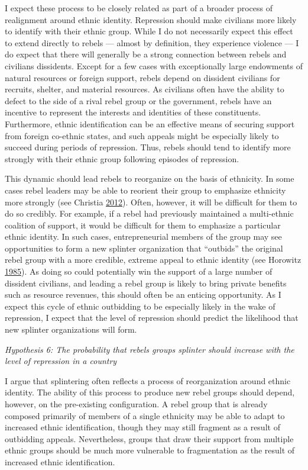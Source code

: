 \documentclass[12pt,]{book}
\theoremstyle{definition}
\theoremstyle{definition}
\theoremstyle{remark}
\begin{document}
I expect these process to be closely related as part of a broader
process of realignment around ethnic identity. Repression should make
civilians more likely to identify with their ethnic group. While I do
not necessarily expect this effect to extend directly to rebels ---
almost by definition, they experience violence --- I do expect that
there will generally be a strong connection between rebels and civilians
dissidents. Except for a few cases with exceptionally large endowments
of natural resources or foreign support, rebels depend on dissident
civilians for recruits, shelter, and material resources. As civilians
often have the ability to defect to the side of a rival rebel group or
the government, rebels have an incentive to represent the interests and
identities of these constituents. Furthermore, ethnic identification can
be an effective means of securing support from foreign co-ethnic states,
and such appeals might be especially likely to succeed during periods of
repression. Thus, rebels should tend to identify more strongly with
their ethnic group following episodes of repression.

This dynamic should lead rebels to reorganize on the basis of ethnicity.
In some cases rebel leaders may be able to reorient their group to
emphasize ethnicity more strongly (see Christia
\protect\hyperlink{ref-Christia2012}{2012}). Often, however, it will be
difficult for them to do so credibly. For example, if a rebel had
previously maintained a multi-ethnic coalition of support, it would be
difficult for them to emphasize a particular ethnic identity. In such
cases, entrepreneurial members of the group may see opportunities to
form a new splinter organization that ``outbids'' the original rebel
group with a more credible, extreme appeal to ethnic identity (see
Horowitz \protect\hyperlink{ref-horowitz85}{1985}). As doing so could
potentially win the support of a large number of dissident civilians,
and leading a rebel group is likely to bring private benefits such as
resource revenues, this should often be an enticing opportunity. As I
expect this cycle of ethnic outbidding to be especially likely in the
wake of repression, I expect that the level of repression should predict
the likelihood that new splinter organizations will form.

\emph{Hypothesis 6: The probability that rebels groups splinter should
increase with the level of repression in a country}

I argue that splintering often reflects a process of reorganization
around ethnic identity. The ability of this process to produce new rebel
groups should depend, however, on the pre-existing configuration. A
rebel group that is already composed primarily of members of a single
ethnicity may be able to adapt to increased ethnic identification,
though they may still fragment as a result of outbidding appeals.
Nevertheless, groups that draw their support from multiple ethnic groups
should be much more vulnerable to fragmentation as the result of
increased ethnic identification.
\end{document}

